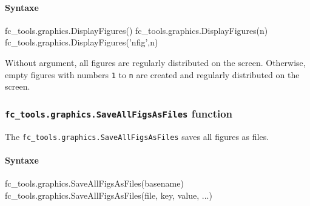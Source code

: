 \documentclass[a4paper,10pt]{article}
\newcommand{\fcmcode}[1]{\mbox{{\color{codecolor}\lstinline[breaklines=false]{#1}}}}
\begin{document}
\paragraph{Syntaxe}
\begin{syntaxe}
fc_tools.graphics.DisplayFigures()
fc_tools.graphics.DisplayFigures(n)
fc_tools.graphics.DisplayFigures('nfig',n)
\end{syntaxe}
Without argument, all figures are regularly distributed on the screen.
Otherwise, empty figures with numbers \fcmcode{1} to \fcmcode{n} are created and regularly distributed on the screen.


\subsubsection[fc\_tools.graphics.SaveAllFigsAsFiles function]{\fcmcode{fc_tools.graphics.SaveAllFigsAsFiles} function}
The \fcmcode{fc_tools.graphics.SaveAllFigsAsFiles} saves all figures as files.

\paragraph{Syntaxe}
\begin{syntaxe}
fc_tools.graphics.SaveAllFigsAsFiles(basename)
fc_tools.graphics.SaveAllFigsAsFiles(file, key, value, ...)
\end{syntaxe}
\end{document}
